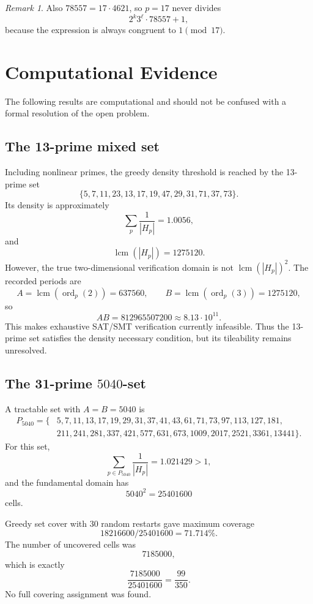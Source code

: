 \documentclass[11pt]{article}
\theoremstyle{definition}
\theoremstyle{remark}
\newtheorem{remark}[theorem]{Remark}
\DeclareMathOperator{\ord}{ord}
\DeclareMathOperator{\lcm}{lcm}
\begin{document}
\begin{remark}
Also \(78557=17\cdot 4621\), so \(p=17\) never divides
\[
        2^k3^\ell\cdot 78557+1,
\]
because the expression is always congruent to \(1\pmod {17}\).
\end{remark}

\section{Computational Evidence}

The following results are computational and should not be confused with a
formal resolution of the open problem.

\subsection{The 13-prime mixed set}

Including nonlinear primes, the greedy density threshold is reached by the
13-prime set
\[
        \{5,7,11,23,13,17,19,47,29,31,71,37,73\}.
\]
Its density is approximately
\[
        \sum_p\frac1{|H_p|}=1.0056,
\]
and
\[
        \lcm(|H_p|)=1275120.
\]
However, the true two-dimensional verification domain is not
\(\lcm(|H_p|)^2\).  The recorded periods are
\[
        A=\lcm(\ord_p(2))=637560,\qquad
        B=\lcm(\ord_p(3))=1275120,
\]
so
\[
        A B = 812965507200 \approx 8.13\cdot 10^{11}.
\]
This makes exhaustive SAT/SMT verification currently infeasible.  Thus the
13-prime set satisfies the density necessary condition, but its tileability
remains unresolved.

\subsection{The 31-prime \(5040\)-set}

A tractable set with \(A=B=5040\) is
\[
\begin{aligned}
P_{5040}=\{&
5,7,11,13,17,19,29,31,37,41,43,61,71,73,97,113,127,181,\\
&211,241,281,337,421,577,631,673,1009,2017,2521,3361,13441\}.
\end{aligned}
\]
For this set,
\[
        \sum_{p\in P_{5040}}\frac1{|H_p|}=1.021429>1,
\]
and the fundamental domain has
\[
        5040^2=25401600
\]
cells.

Greedy set cover with 30 random restarts gave maximum coverage
\[
        18216600/25401600=71.714\%.
\]
The number of uncovered cells was
\[
        7185000,
\]
which is exactly
\[
        \frac{7185000}{25401600}=\frac{99}{350}.
\]
No full covering assignment was found.
\end{document}
